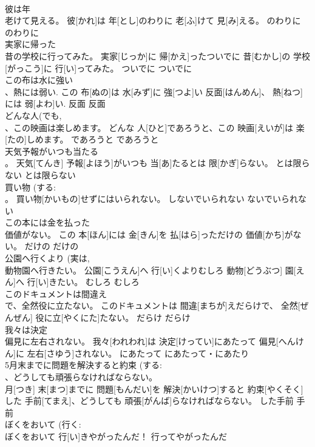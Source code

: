 \documentclass[8pt]{extreport}
\begin{document}
\begin{CJK}{UTF8}{min}
\\	彼は年 
\\	老けて見える。	彼[かれ]は 年[とし]のわりに 老[ふ]けて 見[み]える。	のわりに	のわりに	
\\	実家に帰った 
\\	昔の学校に行ってみた。	実家[じっか]に 帰[かえ]ったついでに 昔[むかし]の 学校[がっこう]に 行[い]ってみた。	ついでに	ついでに	
\\	この布は水に強い 
\\	、熱には弱い.	この 布[ぬの]は 水[みず]に 強[つよ]い 反面[はんめん]、 熱[ねつ]には 弱[よわ]い.	反面	反面	
\\	どんな人(でも, 
\\	、この映画は楽しめます。	どんな 人[ひと]であろうと、この 映画[えいが]は 楽[たの]しめます。	であろうと	であろうと	
\\	天気予報がいつも当たる 
\\	。	天気[てんき] 予報[よほう]がいつも 当[あ]たるとは 限[かぎ]らない。	とは限らない	とは限らない	
\\	買い物 (する: 
\\	。	買い物[かいもの]せずにはいられない。	しないでいられない	ないでいられない	
\\	この本には金を払った 
\\	価値がない。	この 本[ほん]には 金[きん]を 払[はら]っただけの 価値[かち]がない。	だけの	だけの	
\\	公園へ行くより (実は, 
\\	動物園へ行きたい。	公園[こうえん]へ 行[い]くよりむしろ 動物[どうぶつ] 園[えん]へ 行[い]きたい。	むしろ	むしろ	
\\	このドキュメントは間違え 
\\	で、全然役に立たない。	このドキュメントは 間違[まちが]えだらけで、 全然[ぜんぜん] 役に立[やくにた]たない。	だらけ	だらけ	
\\	我々は決定 
\\	偏見に左右されない。	我々[われわれ]は 決定[けってい]にあたって 偏見[へんけん]に 左右[さゆう]されない。	にあたって	にあたって・にあたり	
\\	5月末までに問題を解決すると約束 (する: 
\\	、どうしても頑張らなければならない。	
\\	月[つき] 末[まつ]までに 問題[もんだい]を 解決[かいけつ]すると 約束[やくそく]した 手前[てまえ]、どうしても 頑張[がんば]らなければならない。	した手前	手前	
\\	ぼくをおいて (行く: 
\\	ぼくをおいて 行[い]きやがったんだ！	行ってやがったんだ

\end{CJK}
\end{document}
